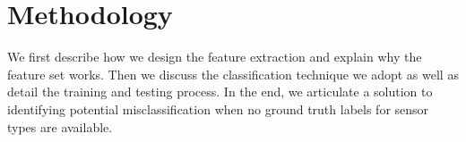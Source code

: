
\section{Methodology}
We first describe how we design the feature extraction and explain why the feature set works. Then we discuss
the classification technique we adopt as well as detail the training and testing process. In the end, we articulate
a solution to identifying potential misclassification when no ground truth labels for sensor types are available.

